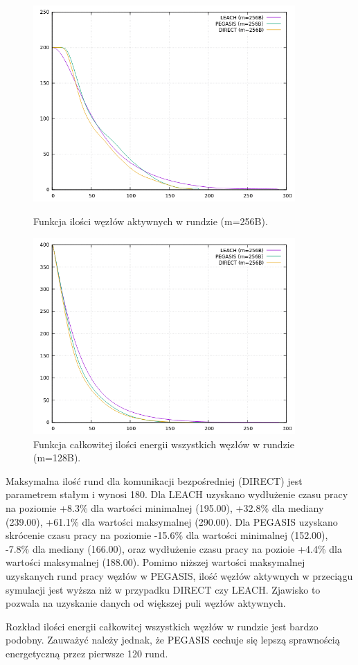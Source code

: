 \documentclass[a4paper,12pt,twoside,openany]{report}
\begin{document}
\begin{figure}[H]
 \centering
 \includegraphics[width=10cm]{images/gnuplot/test_1/nodes_in_round_m256.png}
 \caption{Funkcja ilości węzłów aktywnych w rundzie (m=256B).}
 \includegraphics[width=10cm]{images/gnuplot/test_1/energy_in_round_m256.png}
 \caption{Funkcja całkowitej ilości energii wszystkich węzłów w rundzie (m=128B).}
\end{figure}

\par
Maksymalna ilość rund dla komunikacji bezpośredniej (DIRECT) jest parametrem stałym i wynosi 180.
Dla LEACH uzyskano wydłużenie czasu pracy na poziomie +8.3\% dla wartości minimalnej (195.00), +32.8\% dla mediany (239.00), +61.1\% dla wartości maksymalnej (290.00).
Dla PEGASIS uzyskano skrócenie czasu pracy na poziomie -15.6\% dla wartości minimalnej (152.00), -7.8\% dla mediany (166.00), oraz wydłużenie czasu pracy na pozioie +4.4\% dla wartości maksymalnej (188.00).
Pomimo niższej wartości maksymalnej uzyskanych rund pracy węzłów w PEGASIS, ilość węzłów aktywnych w przeciągu symulacji jest wyższa niż w przypadku DIRECT czy LEACH.
Zjawisko to pozwala na uzyskanie danych od większej puli węzłów aktywnych.
\par
Rozkład ilości energii całkowitej wszystkich węzłów w rundzie jest bardzo podobny.
Zauważyć należy jednak, że PEGASIS cechuje się lepszą sprawnością energetyczną przez pierwsze 120 rund.
\end{document}
